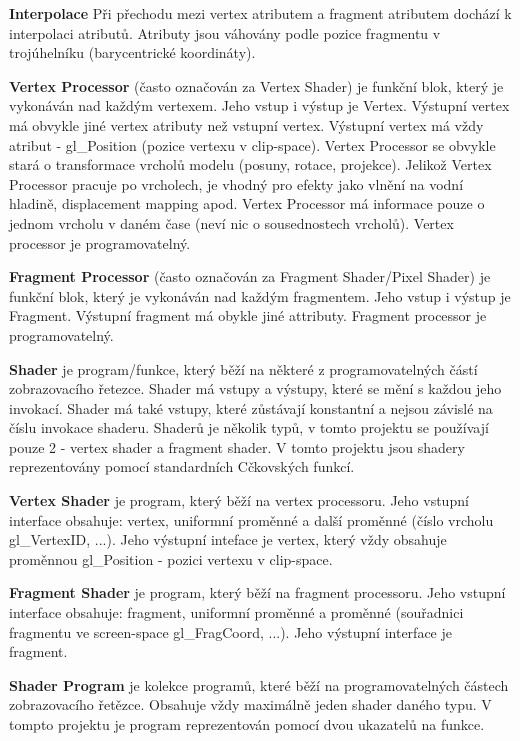 {\bfseries Interpolace} Při přechodu mezi vertex atributem a fragment atributem dochází k interpolaci atributů. Atributy jsou váhovány podle pozice fragmentu v trojúhelníku (barycentrické koordináty). 

{\bfseries Vertex Processor} (často označován za Vertex Shader) je funkční blok, který je vykonáván nad každým vertexem. Jeho vstup i výstup je Vertex. Výstupní vertex má obvykle jiné vertex atributy než vstupní vertex. Výstupní vertex má vždy atribut -\/ gl\-\_\-\-Position (pozice vertexu v clip-\/space). Vertex Processor se obvykle stará o transformace vrcholů modelu (posuny, rotace, projekce). Jelikož Vertex Processor pracuje po vrcholech, je vhodný pro efekty jako vlnění na vodní hladině, displacement mapping apod. Vertex Processor má informace pouze o jednom vrcholu v daném čase (neví nic o sousednostech vrcholů). Vertex processor je programovatelný.

{\bfseries Fragment Processor} (často označován za Fragment Shader/\-Pixel Shader) je funkční blok, který je vykonáván nad každým fragmentem. Jeho vstup i výstup je Fragment. Výstupní fragment má obykle jiné attributy. Fragment processor je programovatelný.

{\bfseries Shader} je program/funkce, který běží na některé z programovatelných částí zobrazovacího řetezce. Shader má vstupy a výstupy, které se mění s každou jeho invokací. Shader má také vstupy, které zůstávají konstantní a nejsou závislé na číslu invokace shaderu. Shaderů je několik typů, v tomto projektu se používají pouze 2 -\/ vertex shader a fragment shader. V tomto projektu jsou shadery reprezentovány pomocí standardních Cčkovských funkcí.

{\bfseries Vertex Shader} je program, který běží na vertex processoru. Jeho vstupní interface obsahuje\-: vertex, uniformní proměnné a další proměnné (číslo vrcholu gl\-\_\-\-Vertex\-I\-D, ...). Jeho výstupní inteface je vertex, který vždy obsahuje proměnnou gl\-\_\-\-Position -\/ pozici vertexu v clip-\/space.

{\bfseries Fragment Shader} je program, který běží na fragment processoru. Jeho vstupní interface obsahuje\-: fragment, uniformní proměnné a proměnné (souřadnici fragmentu ve screen-\/space gl\-\_\-\-Frag\-Coord, ...). Jeho výstupní interface je fragment.

{\bfseries Shader Program} je kolekce programů, které běží na programovatelných částech zobrazovacího řetězce. Obsahuje vždy maximálně jeden shader daného typu. V tompto projektu je program reprezentován pomocí dvou ukazatelů na funkce. 

